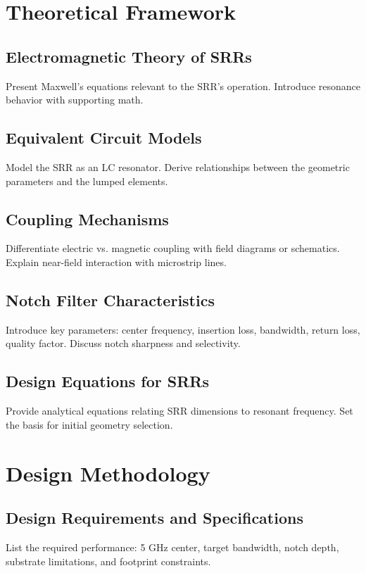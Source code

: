 \documentclass[conference]{IEEEtran}
\begin{document}
\section{Theoretical Framework}

\subsection{Electromagnetic Theory of SRRs}
Present Maxwell’s equations relevant to the SRR’s operation. Introduce resonance behavior with supporting math.

\subsection{Equivalent Circuit Models}
Model the SRR as an LC resonator. Derive relationships between the geometric parameters and the lumped elements.

\subsection{Coupling Mechanisms}
Differentiate electric vs. magnetic coupling with field diagrams or schematics. Explain near-field interaction with microstrip lines.

\subsection{Notch Filter Characteristics}
Introduce key parameters: center frequency, insertion loss, bandwidth, return loss, quality factor. Discuss notch sharpness and selectivity.

\subsection{Design Equations for SRRs}
Provide analytical equations relating SRR dimensions to resonant frequency. Set the basis for initial geometry selection.

\section{Design Methodology}

\subsection{Design Requirements and Specifications}
List the required performance: 5 GHz center, target bandwidth, notch depth, substrate limitations, and footprint constraints.
\end{document}

